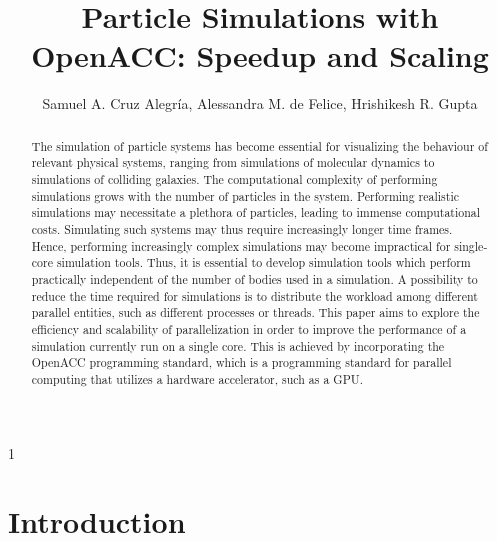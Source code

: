 \documentclass{usiinftr}
\begin{document}
\title{\bf Particle Simulations with OpenACC: Speedup and Scaling}

\author{Samuel A. Cruz Alegr\'{i}a, Alessandra M. de Felice, Hrishikesh R. Gupta}{1}


%
%

%
%

\maketitle

\begin{abstract}
The simulation of particle systems has become essential for visualizing the behaviour of relevant physical systems, ranging from simulations of molecular dynamics to simulations of colliding galaxies. The computational complexity of performing simulations grows with the number of particles in the system. Performing realistic simulations may necessitate a plethora of particles, leading to immense computational costs. Simulating such systems may thus require increasingly longer time frames. Hence, performing increasingly complex simulations may become impractical for single-core simulation tools. Thus, it is essential to develop simulation tools which perform practically independent of the number of bodies used in a simulation. A possibility to reduce the time required for simulations is to distribute the workload among different parallel entities, such as different processes or threads. This paper aims to explore the efficiency and scalability of parallelization in order to improve the performance of a simulation currently run on a single core. This is achieved by incorporating the OpenACC programming standard, which is a programming standard for parallel computing that utilizes a hardware accelerator, such as a GPU.
\end{abstract}

\section{Introduction}
\end{document}
